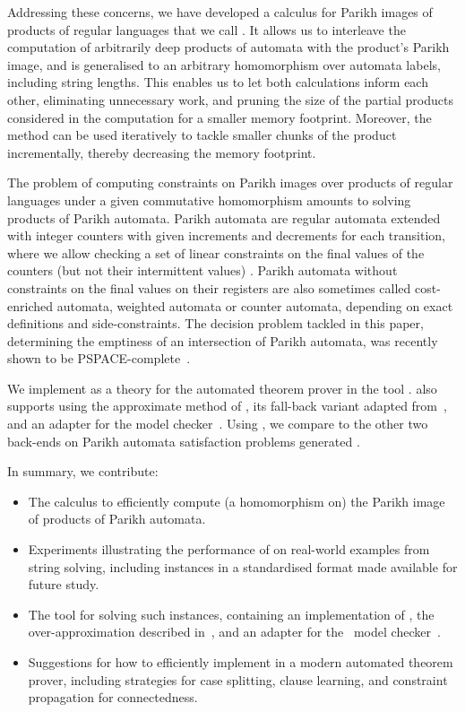 \documentclass[acmsmall,review,anonymous,screen]{acmart}\settopmatter{printfolios=true,printccs=false,printacmref=true}
\theoremstyle{definition}
\begin{document}
Addressing these concerns, we have developed a calculus for Parikh images of
products of regular languages that we call \Calculus{}. It allows us to
interleave the computation of arbitrarily deep products of automata with the
product's Parikh image, and is generalised to an arbitrary homomorphism over
automata labels, including string lengths. This enables us to let both
calculations inform each other, eliminating unnecessary work, and pruning the
size of the partial products considered in the computation for a smaller memory
footprint. Moreover, the method can be used iteratively to tackle smaller chunks
of the product incrementally, thereby decreasing the memory footprint.

The problem of computing constraints on Parikh images over products of regular
languages under a given commutative homomorphism amounts to solving products of
Parikh automata. Parikh automata are regular automata extended with integer
counters with given increments and decrements for each transition, where we
allow checking a set of linear constraints on the final values of the counters
(but not their intermittent values) \cite{parikh-automata}. Parikh automata
without constraints on the final values on their registers are also sometimes
called cost-enriched automata, weighted automata or counter automata, depending
on exact definitions and side-constraints. The decision problem tackled in this
paper, determining the emptiness of an intersection of Parikh automata, was
recently shown to be PSPACE-complete~\cite{graph-queries}.

We implement \Calculus{} as a theory for the \Princess{} automated theorem
prover in the tool \Catra{}. \Catra also supports using the
approximate method of \cite{approximate-parikh}, its fall-back variant adapted
from~\cite{generate-parikh-image}, and an adapter for the \Nuxmv{} model
checker~\cite{nuxmv}. Using \Catra{}, we compare \Calculus{} to the other two
back-ends on \NrBenchmarks{} Parikh automata satisfaction problems generated
.

In summary, we contribute:
\begin{itemize}
\item The \Calculus{} calculus to efficiently compute (a homomorphism on) the
Parikh image of products of Parikh automata.
\item Experiments illustrating the performance of \Calculus{} on real-world examples from string solving, including \NrBenchmarks{} instances in a standardised format made available for future study.
\item The \Catra{} tool for solving such instances, containing an implementation of \Calculus{}, the over-approximation described in~\cite{approximate-parikh}, and an adapter for the~\Nuxmv{} model checker~\cite{nuxmv}.
\item Suggestions for how to efficiently implement \Calculus{} in a modern automated theorem prover, including strategies for case splitting, clause learning, and constraint propagation for connectedness.
\end{itemize}
\end{document}
